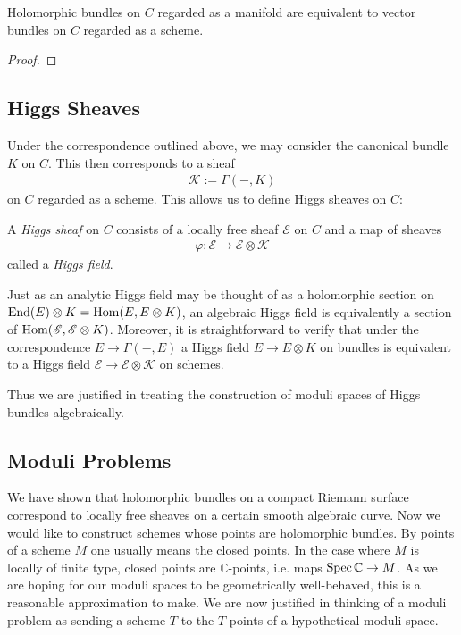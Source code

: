 \documentclass[12pt]{ociamthesis}  %
\begin{document}
\begin{lemma}
  Holomorphic bundles on $C$ regarded as a manifold are equivalent
  to vector bundles on $C$ regarded as a scheme.
  \begin{proof}
    \missingproof
  \end{proof}
\end{lemma}

\subsection{Higgs Sheaves}

Under the correspondence outlined above, we may consider the canonical
bundle $K$ on $C$. This then corresponds to a sheaf
\begin{align*}
  \mathscr K := \Gamma(-,K)
\end{align*}
on $C$ regarded as a scheme. This allows us to define Higgs
sheaves on $C$:

\begin{definition}
  A \emph{Higgs sheaf} on $C$ consists of a locally free sheaf
  $\mathscr E$ on $C$ and a map of sheaves
  \begin{align*}
    \varphi : \mathscr E \to \mathscr E \otimes \mathscr K
  \end{align*}
  called a \emph{Higgs field}.
\end{definition}

Just as an analytic Higgs field may be thought of as a holomorphic
section on $\operatorname{End}(E)\otimes K = \operatorname{Hom}(E,E\otimes K)$, an algebraic
Higgs field is equivalently a section of $\operatorname{Hom}(\mathscr E,\mathscr E\otimes K)$.
Moreover, it is straightforward to verify that under the correspondence
$E\to\Gamma(-,E)$ a Higgs field $E\to E\otimes K$ on bundles is
equivalent to a Higgs field $\mathscr E\to\mathscr E\otimes\mathscr K$
on schemes.

Thus we are justified in treating the construction of moduli
spaces of Higgs bundles algebraically.

\subsection{Moduli Problems}

We have shown that holomorphic bundles on a compact Riemann surface
correspond to locally free sheaves on a certain smooth algebraic
curve. Now we would like to construct schemes whose points are
holomorphic bundles. By points of a scheme $M$ one usually means the
closed points. In the case where $M$ is locally of finite type,
closed points are $\mathbb{C}$-points, i.e. maps
$\operatorname{Spec}\mathbb{C}\to M$. \cite[Corollary 3.36]{gortz2010} As we
are hoping for our moduli spaces to be geometrically well-behaved,
this is a reasonable approximation to make. We are now justified in
thinking of a moduli problem as sending a scheme $T$ to the
$T$-points of a hypothetical moduli space.
\end{document}
